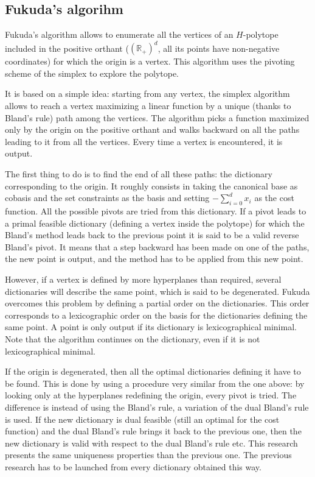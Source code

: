\subsection{Fukuda's algorihm}

Fukuda's algorithm allows to enumerate all the vertices of an $H$-polytope included in the positive orthant ($(\mathbb{R}_+)^d$, all its points have non-negative coordinates) for which the origin is a vertex. This algorithm uses the pivoting scheme of the simplex to explore the polytope. 

It is based on a simple idea: starting from any vertex, the simplex algorithm allows to reach a vertex maximizing a linear function by a unique (thanks to Bland's rule) path among the vertices. The algorithm picks a function maximized only by the origin on the positive orthant and walks backward on all the paths leading to it from all the vertices. Every time a vertex is encountered, it is output.

The first thing to do is to find the end of all these paths: the dictionary corresponding to the origin. It roughly consists in taking the canonical base as cobasis and the set constraints as the basis and setting $-\sum_{i=0}^d x_i$ as the cost function. All the possible pivots are tried from this dictionary. If a pivot leads to a primal feasible dictionary (defining a vertex inside the polytope) for which the Bland's method leads back to the previous point it is said to be a valid reverse Bland's pivot. It means that a step backward has been made on one of the paths, the new point is output, and the method has to be applied from this new point.

However, if a vertex is defined by more hyperplanes than required, several dictionaries will describe the same point, which is said to be degenerated. Fukuda overcomes this problem by defining a partial order on the dictionaries. This order corresponds to a lexicographic order on the basis for the dictionaries defining the same point. A point is only output if its dictionary is lexicographical minimal. Note that the algorithm continues on the dictionary, even if it is not lexicographical minimal.

If the origin is degenerated, then all the optimal dictionaries defining it have to be found. This is done by using a procedure very similar from the one above: by looking only at the hyperplanes redefining the origin, every pivot is tried. The difference is instead of using the Bland's rule, a variation of the dual Bland's rule is used. If the new dictionary is dual feasible (still an optimal for the cost function) and the dual Bland's rule brings it back to the previous one, then the new dictionary is valid with respect to the dual Bland's rule etc. This research presents the same uniqueness properties than the previous one. The previous research has to be launched from every dictionary obtained this way.

